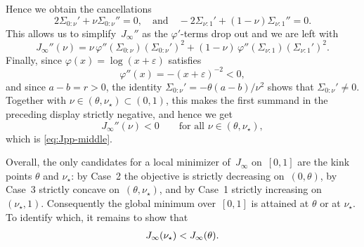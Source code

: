 \documentclass[10pt, letterpaper]{amsart}
\begin{document}
Hence we obtain the cancellations
\[
2\Sigma_{0:\nu}'+\nu \Sigma_{0:\nu}'' =0, \quad \mbox{and} \quad -2\Sigma_{\nu:1}'+(1-\nu)\Sigma_{\nu:1}''
= 0.
\]
This allows us to simplify~$J_\infty''$ as the $\varphi'$-terms drop out and we are left with
\[
J_\infty''(\nu)
= \nu\,\varphi''(\Sigma_{0:\nu})(\Sigma_{0:\nu}')^2
  + (1-\nu)\,\varphi''(\Sigma_{\nu:1})(\Sigma_{\nu:1}')^2.
\]
Finally, since $\varphi(x)=\log(x+\varepsilon)$ satisfies
\[
\varphi''(x)=-(x+\varepsilon)^{-2}<0,
\]
and since $a-b=r>0$, the identity
$\Sigma_{0:\nu}'=-\theta(a-b)/\nu^2$ shows that
$\Sigma_{0:\nu}'\neq0$. Together with
$\nu\in(\theta,\nu_\star)\subset(0,1)$, this makes the first summand in the
preceding display strictly negative, and hence we get
\[
J_\infty''(\nu)<0\qquad\text{for all }\nu\in(\theta,\nu_\star),
\]
which is \eqref{eq:Jpp-middle}. \smallskip

Overall, the only candidates for a local minimizer of~$J_{\infty}$ on~$[0,1]$ are the kink points $\theta$ and $\nu_\star$: by Case~2 the objective is strictly decreasing on~$(0,\theta)$, by Case~3 strictly concave on~$(\theta,\nu_\star)$, and by Case~1 strictly increasing on~$(\nu_\star,1)$. Consequently the global minimum over~$[0,1]$ is attained at $\theta$ or at $\nu_\star$. To identify which, it remains to show that
\begin{align}\label{equ:optimal_energy_gap}
    J_\infty(\nu_\star)<J_\infty(\theta).    \smallskip
\end{align}
\end{document}
